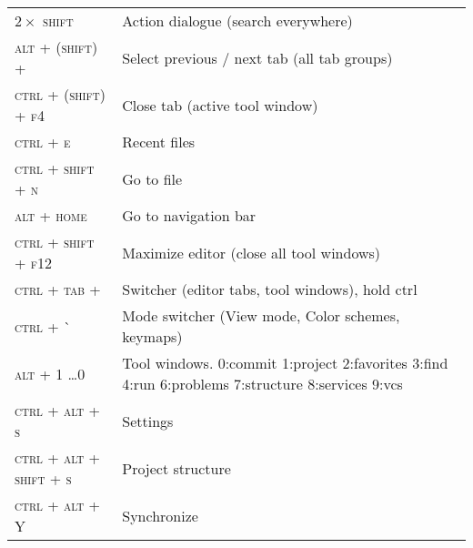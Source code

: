 \documentclass[10pt,a4paper]{article}
\newenvironment{mycolorbox}[2]{%
\begin{tcolorbox}[grow to left by=-1em,grow to right by=-1em,capture=minipage,fonttitle=\large\bfseries, enhanced jigsaw,boxsep=1mm,colback=#1!30!white,on line,tcbox width=auto, toptitle=0mm,colframe=#1,opacityback=0.25,nobeforeafter,title=#2]%
}{\end{tcolorbox}\\[0.2em]}
\newenvironment{textbox}[1]{\begin{mycolorbox}{customcolor}{#1}}{\end{mycolorbox}}
\newcommand{\scut}[1]{\textsc{#1}}
\begin{document}
\small
\begin{multicols}{2}
[]

\begin{textbox}{IDE Navigation}
{
{\renewcommand{\arraystretch}{1.4}
\begin{tabularx}{\textwidth}{>{\setlength\hsize{.38\hsize}\raggedleft\arraybackslash}X|X}
\scut{$2\times$ shift}	&	Action dialogue (search everywhere)	\\
\scut{alt + (shift) + \textleftarrow\textrightarrow}	&	Select previous / next tab (all tab groups) \\
\scut{ctrl + (shift) + f4}	&	Close tab (active tool window)	\\
\scut{ctrl + e}	&	Recent files	\\
\scut{ctrl + shift + n}	&	Go to file	\\
\scut{alt + home}	&	Go to navigation bar	\\
\scut{ctrl + shift + f12}	&	Maximize editor (close all tool windows)	\\
\scut{ctrl + tab + \textdownarrow\textuparrow\textleftarrow\textrightarrow}	&	Switcher (editor tabs, tool windows), hold ctrl	\\
\scut{ctrl + \`}	&	Mode switcher (View mode, Color schemes, keymaps)	\\
\scut{alt + 1 \dots 0}	&	Tool windows. 0:commit 1:project 2:favorites 3:find 4:run 6:problems 7:structure 8:services 9:vcs	\\
\scut{ctrl + alt + s}	&	Settings	\\
\scut{ctrl + alt + shift + s}	&	Project structure	\\
\scut{ctrl + alt + Y}	&	Synchronize
\end{tabularx}}}
\end{textbox}


\end{multicols}
\end{document}
